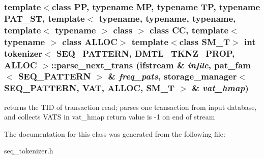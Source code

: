 \subsubsection{\setlength{\rightskip}{0pt plus 5cm}template$<$class PP, typename MP, typename TP, typename PAT\_\-ST, template$<$ typename, typename, typename, template$<$ typename $>$ class $>$ class CC, template$<$ typename $>$ class ALLOC$>$ template$<$class SM\_\-T$>$ int \bf{tokenizer}$<$ SEQ\_\-PATTERN, DMTL\_\-TKNZ\_\-PROP, ALLOC $>$::parse\_\-next\_\-trans (ifstream \& {\em infile}, \bf{pat\_\-fam}$<$ SEQ\_\-PATTERN $>$ \& {\em freq\_\-pats}, \bf{storage\_\-manager}$<$ SEQ\_\-PATTERN, \bf{VAT}, ALLOC, SM\_\-T $>$ \& {\em vat\_\-hmap})\hspace{0.3cm}{\tt  [inline]}}\label{classtokenizer_3_01SEQ__PATTERN_00_01DMTL__TKNZ__PROP_00_01ALLOC_01_4_5bc220963689f3174937ababd4f8574a}


returns the TID of transaction read; parses one transaction from input database, and collects VATS in vat\_\-hmap return value is -1 on end of stream 

The documentation for this class was generated from the following file:\begin{CompactItemize}
\item 
seq\_\-tokenizer.h\end{CompactItemize}
